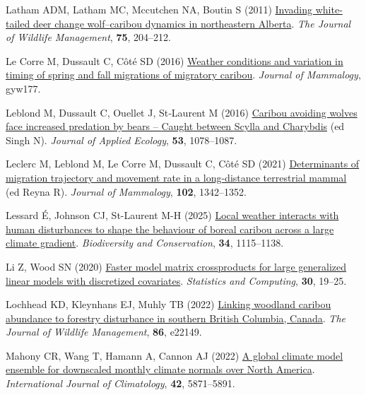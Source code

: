 \documentclass[
  12pt,
]{article}
\newlength{\cslhangindent}
\newenvironment{CSLReferences}[2] %
 {\begin{list}{}{%
  \setlength{\itemindent}{0pt}
  \setlength{\leftmargin}{0pt}
  \setlength{\parsep}{0pt}
  \ifodd #1
   \setlength{\leftmargin}{\cslhangindent}
   \setlength{\itemindent}{-1\cslhangindent}
  \fi
  \setlength{\itemsep}{#2\baselineskip}}}
 {\end{list}}
\begin{document}
\begin{CSLReferences}{1}{0}
Latham ADM, Latham MC, Mccutchen NA, Boutin S (2011) \href{https://doi.org/10.1002/jwmg.28}{Invading white‐tailed deer change wolf--caribou dynamics in northeastern {Alberta}}. \emph{The Journal of Wildlife Management}, \textbf{75}, 204--212.

Le Corre M, Dussault C, Côté SD (2016) \href{https://doi.org/10.1093/jmammal/gyw177}{Weather conditions and variation in timing of spring and fall migrations of migratory caribou}. \emph{Journal of Mammalogy}, gyw177.

Leblond M, Dussault C, Ouellet J, St‐Laurent M (2016) \href{https://doi.org/10.1111/1365-2664.12658}{Caribou avoiding wolves face increased predation by bears -- {Caught} between {Scylla} and {Charybdis}} (ed Singh N). \emph{Journal of Applied Ecology}, \textbf{53}, 1078--1087.

Leclerc M, Leblond M, Le Corre M, Dussault C, Côté SD (2021) \href{https://doi.org/10.1093/jmammal/gyab081}{Determinants of migration trajectory and movement rate in a long-distance terrestrial mammal} (ed Reyna R). \emph{Journal of Mammalogy}, \textbf{102}, 1342--1352.

Lessard É, Johnson CJ, St-Laurent M-H (2025) \href{https://doi.org/10.1007/s10531-025-03012-1}{Local weather interacts with human disturbances to shape the behaviour of boreal caribou across a large climate gradient}. \emph{Biodiversity and Conservation}, \textbf{34}, 1115--1138.

Li Z, Wood SN (2020) \href{https://doi.org/10.1007/s11222-019-09864-2}{Faster model matrix crossproducts for large generalized linear models with discretized covariates}. \emph{Statistics and Computing}, \textbf{30}, 19--25.

Lochhead KD, Kleynhans EJ, Muhly TB (2022) \href{https://doi.org/10.1002/jwmg.22149}{Linking woodland caribou abundance to forestry disturbance in southern {British} {Columbia}, {Canada}}. \emph{The Journal of Wildlife Management}, \textbf{86}, e22149.

Mahony CR, Wang T, Hamann A, Cannon AJ (2022) \href{https://doi.org/10.1002/joc.7566}{A global climate model ensemble for downscaled monthly climate normals over {North} {America}}. \emph{International Journal of Climatology}, \textbf{42}, 5871--5891.


\end{CSLReferences}
\end{document}
